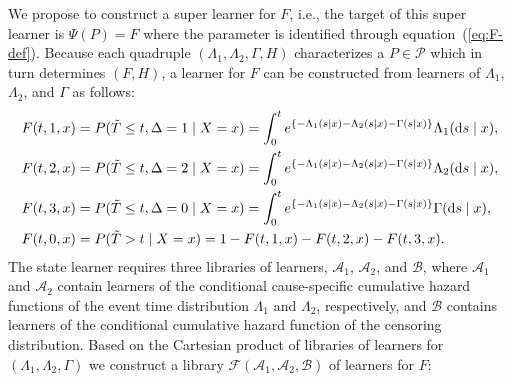 \documentclass[a4,danish]{article}
\newcommand{\data}{\ensuremath{\mathcal{D}}}
\begin{document}
We propose to construct a super learner for \( F \), i.e., the target of this
super learner is $\Psi(P) = F$ where the parameter is identified through
equation~(\ref{eq:F-def}). Because each quadruple
$(\Lambda_{1}, \Lambda_{2}, \Gamma, H)$ characterizes a \(P\in\mathcal P\) which
in turn determines \( (F, H) \), a learner for \( F \) can be constructed from
learners of \( \Lambda_1 \), \( \Lambda_2 \), and $\Gamma$ as follows:
\begin{equation}\label{eq:transition}
  \begin{split}
  F(t, 1, x)
  & = P(\tilde{T} \leq t, \Delta=1 \mid X=x)
    = \int_0^t e^{\{-\Lambda_{1}(s \mid x)-\Lambda_{2}(s \mid x) - \Gamma(s \mid x)\} }  \Lambda_{1}(\mathop{}\!\mathrm{d} s \mid x),
  \\
  F(t, 2, x)
  & = P(\tilde{T} \leq t, \Delta=2 \mid X=x)
    = \int_0^t e^{\{-\Lambda_{1}(s \mid x)-\Lambda_{2}(s \mid x) - \Gamma(s \mid x)\} }  \Lambda_{2}(\mathop{}\!\mathrm{d} s \mid x),
  \\
  F(t, 3, x)
  & =
    P(\tilde{T} \leq t, \Delta=0 \mid X=x)
    = \int_0^t e^{\{-\Lambda_{1}(s \mid x)-\Lambda_{2}(s \mid x) - \Gamma(s \mid x)\} }  \Gamma(\mathop{}\!\mathrm{d} s \mid x),
  \\
  F(t, 0, x)
  &
    = P(\tilde{T} > t \mid X= x)
    = 1- F(t, 1, x) - F(t, 2, x)- F(t, 3, x).
  \end{split}
\end{equation}
The state learner requires three libraries of learners, \(\mathcal{A}_1\),
\( \mathcal{A}_2 \), and \( \mathcal{B} \), where \(\mathcal{A}_1\) and
\( \mathcal{A}_2\) contain learners of the conditional cause-specific cumulative
hazard functions of the event time distribution \(\Lambda_1\) and
\( \Lambda_2\), respectively, and \(\mathcal{B}\) contains learners of the
conditional cumulative hazard function of the censoring
distribution. %
Based on the Cartesian product of
libraries of learners for \((\Lambda_1,\Lambda_2,\Gamma)\) we construct a library
$\mathcal{F}(\mathcal{A}_1, \mathcal{A}_2, \mathcal{B})$ of learners
for \( F \):
\end{document}
